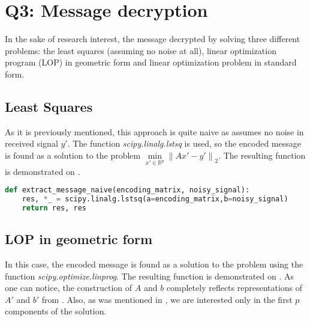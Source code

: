 \documentclass{article}
\def\R{\mathbb{R}}
\begin{document}

\section{Q3: Message decryption}

In the sake of research interest, the message decrypted by solving three different problems: the least squares (assuming no noise at all), linear optimization program (LOP) in geometric form and linear optimization problem in standard form.

\subsection{Least Squares}
As it is previously mentioned, this approach is quite naive as assumes no noise in received signal $y'$. The function \textit{scipy.linalg.lstsq} is used, so the encoded message is found as a solution to the problem $\min\limits_{x' \in \R^p} {\| Ax'-y' \|}_2$. The resulting function is demonstrated on .

\begin{lstlisting}[language=Python, caption={Naive message decryption. The output is tuple of solution of the problem, and decrypted message itself}, label={lst:naive}]
  def extract_message_naive(encoding_matrix, noisy_signal):
    res, *_ = scipy.linalg.lstsq(a=encoding_matrix,b=noisy_signal)
    return res, res
\end{lstlisting}


\subsection{LOP in geometric form}
In this case, the encoded message is found as a solution to the problem  using the function \textit{scipy.optimize.linprog}. The resulting function is demonstrated on . As one can notice, the construction of $A$ and $b$ completely reflects representations of $A'$ and $b'$ from . Also, as was mentioned in , we are interested only in the first $p$ components of the solution.
\end{document}
